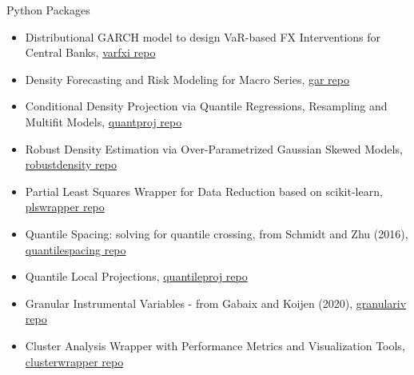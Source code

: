 \documentclass[usegeometry, 10pt, a4paper]{cv} %
\begin{document}
\begin{rubriquetableau}[0.95\textwidth]{Python Packages}\\
  \vspace{-0.8cm}
  
\begin{itemize}
\item Distributional GARCH model to design VaR-based FX Interventions for Central Banks, \href{https://github.com/romainlafarguette/varfxi}{varfxi repo} 
\item Density Forecasting and Risk Modeling for Macro Series, \href{https://github.com/IMFGAR/GaR}{gar repo}
\item Conditional Density Projection via Quantile Regressions, Resampling and Multifit Models, \href{https://github.com/romainlafarguette/gar}{quantproj repo}
\item Robust Density Estimation via Over-Parametrized Gaussian Skewed Models, \href{https://github.com/romainlafarguette/robustdensity}{robustdensity repo}
\item Partial Least Squares Wrapper for Data Reduction based on scikit-learn, \href{https://github.com/romainlafarguette/plswrapper}{plswrapper repo}
\item Quantile Spacing: solving for quantile crossing, from Schmidt and Zhu (2016), \href{https://github.com/romainlafarguette/quantilespacing}{quantilespacing repo}
\item Quantile Local Projections, \href{https://github.com/romainlafarguette/quantileproj}{quantileproj repo}
\item Granular Instrumental Variables - from Gabaix and Koijen (2020), \href{https://github.com/romainlafarguette/granulariv}{granulariv repo}
\item Cluster Analysis Wrapper with Performance Metrics and Visualization Tools, \href{https://github.com/romainlafarguette/clusterwrapper}{clusterwrapper repo}
\end{itemize}  

\end{rubriquetableau}

\end{document}
